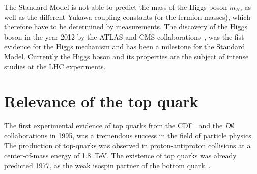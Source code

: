 The Standard Model is not able to predict the mass of the Higgs boson $m_H$, as well as the different Yukawa coupling constants (or the fermion masses), which therefore have to be determined by measurements. The discovery of the Higgs boson in the year 2012 by the ATLAS and CMS collaborations~\cite{Aad:2012tfa,Chatrchyan:2012xdj}, was the fist evidence  for the Higgs mechanism and has been a milestone for the Standard Model. Currently the Higgs boson and its properties are the subject of intense studies at the LHC experiments. 
























\section{Relevance of the top quark}\label{Relevanz}

The first experimental evidence of top quarks from the CDF~\cite{Abe:1995hr} and the $D \emptyset$~\cite{Abachi:1995iq} collaborations in 1995, was a tremendous success in the field of particle physics. 
The production of top-quarks was observed in proton-antiproton collisions at a center-of-mass energy of 1.8~TeV. The existence of top quarks was already predicted 1977, as the weak isospin partner of the bottom quark~\cite{Herb:1977ek}. 

